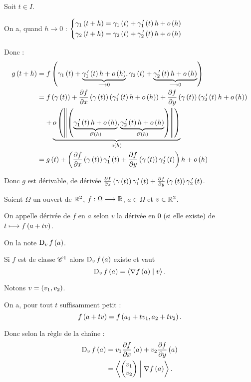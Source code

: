\begin{dem}
Soit \(t\in I\).

On a, quand \(h\to0\) : \(\begin{dcases}
\gamma_1\left(t+h\right)=\gamma_1\left(t\right)+\gamma_1^{\,\prime}\left(t\right)h+o\left(h\right) \\
\gamma_2\left(t+h\right)=\gamma_2\left(t\right)+\gamma_2^{\,\prime}\left(t\right)h+o\left(h\right)
\end{dcases}\)

Donc : \[\begin{aligned}
g\paren{t+h}&=f\paren{\gamma_1\paren{t}+\underbrace{\gamma_1\prim\paren{t}h+\o{h}}_{\to0},\gamma_2\paren{t}+\underbrace{\gamma_2\prim\paren{t}h+\o{h}}_{\to0}} \\
&=f\paren{\gamma\paren{t}}+\pdv{f}{x}\paren{\gamma\paren{t}}\paren{\gamma_1\prim\paren{t}h+\o{h}}+\pdv{f}{y}\paren{\gamma\paren{t}}\paren{\gamma_2\prim\paren{t}h+\o{h}} \\
&\color{white}=\color{black}+\underbrace{\o{\norme{\paren{\underbrace{\gamma_1\prim\paren{t}h+\o{h}}_{\O{h}},\underbrace{\gamma_2\prim\paren{t}h+\o{h}}_{\O{h}}}}}}_{\o{h}} \\
&=g\paren{t}+\paren{\pdv{f}{x}\paren{\gamma\paren{t}}\gamma_1\prim\paren{t}+\pdv{f}{y}\paren{\gamma\paren{t}}\gamma_2\prim\paren{t}}h+\o{h}
\end{aligned}\]

Donc \(g\) est dérivable, de dérivée \(\pdv{f}{x}\left(\gamma\left(t\right)\right)\gamma_1^{\,\prime}\left(t\right)+\pdv{f}{y}\left(\gamma\left(t\right)\right)\gamma_2^{\,\prime}\left(t\right)\).
\end{dem}

\begin{defprop}
Soient \(\Omega\) un ouvert de \(\mathbb{R}^2\), \(f:\Omega\longrightarrow\mathbb{R}\), \(a\in\Omega\) et \(v\in\mathbb{R}^2\).

On appelle dérivée de \(f\) en \(a\) selon \(v\) la dérivée en \(0\) (si elle existe) de \(t\longmapsto f\left(a+tv\right)\).

On la note \(\operatorname{D}_{v}f\left(a\right)\).

Si \(f\) est de classe \(\mathscr{C}^{1}\) alors \(\operatorname{D}_{v}f\left(a\right)\) existe et vaut \[\operatorname{D}_{v}f\left(a\right)=\left\langle\nabla f\left(a\right)\;\middle|\; v\right\rangle.\]
\end{defprop}

\begin{dem}
Notons \(v=\left(v_1,v_2\right)\).

On a, pour tout \(t\) suffisamment petit : \[f\left(a+tv\right)=f\left(a_1+tv_1,a_2+tv_2\right).\]

Donc selon la règle de la chaîne : \[\begin{aligned}
\operatorname{D}_{v}f\left(a\right)&=v_1\pdv{f}{x}\left(a\right)+v_2\pdv{f}{y}\left(a\right) \\
&=\left\langle\begin{pmatrix}v_1\\v_2\end{pmatrix}\;\middle|\;\nabla f\left(a\right)\right\rangle.
\end{aligned}\]
\end{dem}

